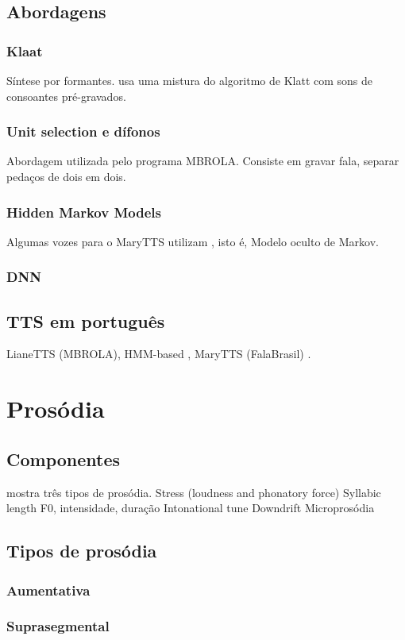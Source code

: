 \subsection{Abordagens}
\subsubsection{Klaat}
Síntese por formantes. \cite{espeakng} usa uma mistura do algoritmo de Klatt com
sons de consoantes pré-gravados.
\subsubsection{Unit selection e dífonos}
Abordagem utilizada pelo programa MBROLA. Consiste em gravar fala, separar
pedaços de dois em dois.
\subsubsection{Hidden Markov Models}
Algumas vozes para o MaryTTS \cite{marytts} utilizam , isto é, Modelo oculto de Markov.
\subsubsection{DNN}
\subsection{TTS em português}
LianeTTS (MBROLA), HMM-based \cite{couto}, MaryTTS (FalaBrasil) \cite{falabrasil}.
\section{Prosódia}
\subsection{Componentes}
 mostra três tipos de prosódia.
Stress (loudness and phonatory force)
Syllabic length
F0, intensidade, duração
Intonational tune
Downdrift
Microprosódia
\subsection{Tipos de prosódia}
\subsubsection{Aumentativa}
\subsubsection{Suprasegmental}

